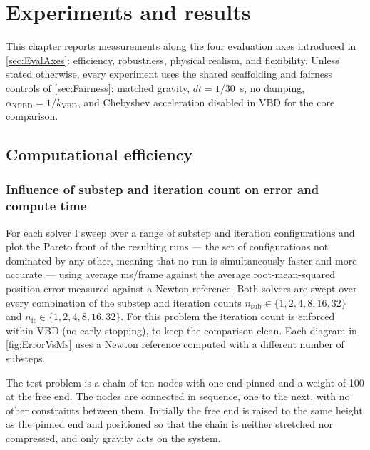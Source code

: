 \chapter{Experiments and results}
\label{chap:Experiments}

This chapter reports measurements along the four evaluation axes introduced in
\autoref{sec:EvalAxes}: efficiency, robustness, physical realism, and
flexibility. Unless stated otherwise, every experiment uses the shared
scaffolding and fairness controls of \autoref{sec:Fairness}: matched gravity,
$dt = 1/30$~s, no damping, $\alpha_{\mathrm{XPBD}} = 1/k_{\mathrm{VBD}}$, and
Chebyshev acceleration disabled in VBD for the core comparison.

\section{Computational efficiency}
\label{sec:EffResults}

\subsection{Influence of substep and iteration count on error and compute time}
\label{ssec:ErrorVsMs}

For each solver I sweep over a range of substep and iteration configurations and
plot the Pareto front of the resulting runs --- the set of configurations not
dominated by any other, meaning that no run is simultaneously faster and more
accurate --- using average ms/frame against the average root-mean-squared
position error measured against a Newton reference. Both solvers are swept over
every combination of the substep and iteration counts
$n_{\mathrm{sub}} \in \{1, 2, 4, 8, 16, 32\}$ and
$n_{\mathrm{it}} \in \{1, 2, 4, 8, 16, 32\}$. For this problem the iteration count
is enforced within VBD (no early stopping), to keep the comparison clean. Each
diagram in \autoref{fig:ErrorVsMs} uses a Newton reference computed with a
different number of substeps.

The test problem is a chain of ten nodes with one end pinned and a weight of 100
at the free end. The nodes are connected in sequence, one to the next, with no
other constraints between them. Initially the free end is raised to the same
height as the pinned end and positioned so that the chain is neither stretched nor
compressed, and only gravity acts on the system.

